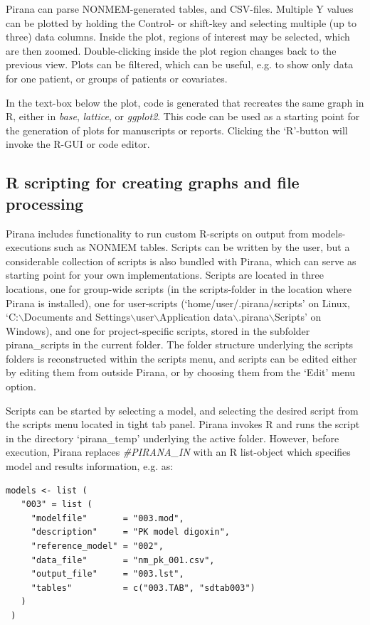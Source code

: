{{{{  Pirana can parse NONMEM-generated tables, and CSV-files. Multiple Y values
  can be plotted by holding the Control- or shift-key and selecting
  multiple (up to three) data columns. Inside the plot, regions of
  interest may be selected, which are then zoomed. Double-clicking
  inside the plot region changes back to the previous view. Plots can
  be filtered, which can be useful, e.g. to show only data for one
  patient, or groups of patients or covariates.

  In the text-box below the plot, code is generated that recreates
  the same graph in R, either in \textit{base}, \textit{lattice}, or
  \textit{ggplot2}. This code can be used as a starting
  point for the generation of plots for manuscripts or
  reports. Clicking the `R'-button will invoke the R-GUI or code
  editor.

\subsection{R scripting for creating graphs and file processing}
Pirana includes functionality to run custom R-scripts on output from
models-executions such as NONMEM tables. Scripts can be written by the
user, but a considerable collection of scripts is also bundled with
Pirana, which can serve as starting point for your own
implementations. Scripts are located in three locations, one for
group-wide scripts (in the scripts-folder in the location where Pirana
is installed), one for user-scripts (`home/user/.pirana/scripts'
on Linux, `C:$\backslash$Documents and
Settings$\backslash$user$\backslash$Application
data$\backslash$.pirana$\backslash$Scripts' on Windows), and one for project-specific scripts, stored in the subfolder pirana\_scripts in the current folder. The folder
structure underlying the scripts folders is reconstructed within the
scripts menu, and scripts can be edited either by editing them from
outside Pirana, or by choosing them from the `Edit' menu option.

Scripts can be started by selecting a model, and selecting the desired
script from the scripts menu located in tight tab panel. Pirana invokes R and runs the script in the
directory `pirana\_temp' underlying the active folder.  However,
before execution, Pirana replaces \textit{\#PIRANA\_IN} with an R
list-object which specifies model and results information, e.g. as:

\begin{lstlisting}
models <- list (
   "003" = list (
     "modelfile"       = "003.mod",
     "description"     = "PK model digoxin",
     "reference_model" = "002",
     "data_file"       = "nm_pk_001.csv",
     "output_file"     = "003.lst",
     "tables"          = c("003.TAB", "sdtab003")
   )
 )
\end{lstlisting}

}}}}
